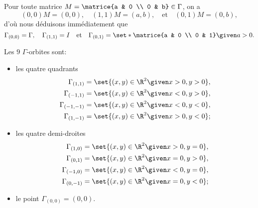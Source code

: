 Pour toute matrice $M = \matrice{a & 0 \\ 0 & b}\in\Gamma$, on a
\[
  (0,0) M = (0,0),
  \quad
  (1,1) M = (a,b),
  \quad\text{et}\quad
  (0,1) M = (0,b),
\]
%
d'où nous déduisons immédiatement que 
\[
  \Gamma_{(0,0)} = \Gamma,
  \quad
  \Gamma_{(1,1)} = I
  \quad\text{et}\quad
  \Gamma_{(0,1)} = \set*{\matrice{a & 0 \\ 0 & 1} \given a > 0}.
\]

Les $9$ $\Gamma$-orbites sont:

\begin{itemize}
  \item
    les quatre quadrants
    \begin{align*}
      \Gamma_{(1,1)}   &= \set{(x,y)\in\R^2 \given x > 0, y > 0}, \\
      \Gamma_{(-1,1)}  &= \set{(x,y)\in\R^2 \given x < 0, y > 0}, \\
      \Gamma_{(-1,-1)} &= \set{(x,y)\in\R^2 \given x < 0, y < 0}, \\
      \Gamma_{(1,-1)}  &= \set{(x,y)\in\R^2 \given x > 0, y < 0};
    \end{align*}

  \item
    les quatre demi-droites
    \begin{align*}
      \Gamma_{(1,0)} &= \set{(x,y)\in\R^2 \given x > 0, y = 0}, \\
      \Gamma_{(0,1)} &= \set{(x,y)\in\R^2 \given x = 0, y > 0}, \\
      \Gamma_{(-1,0)} &= \set{(x,y)\in\R^2 \given x < 0, y = 0}, \\
      \Gamma_{(0,-1)} &= \set{(x,y)\in\R^2 \given x = 0, y < 0}; \\
    \end{align*}

  \item
    le point $\Gamma_{(0,0)} = {(0,0)}$.
\end{itemize}
